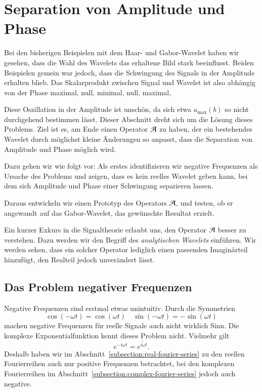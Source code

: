 \section{Separation von Amplitude und Phase}
\label{complex:separate}

Bei den bisherigen Beispielen mit dem Haar- und Gabor-Wavelet haben wir gesehen, dass die Wahl des Wavelets das erhaltene Bild stark beeinflusst.
Beiden Beispielen gemein war jedoch, dass die Schwingung des Signals in der Amplitude erhalten blieb.
Das Skalarprodukt zwischen Signal und Wavelet ist also abhängig von der Phase maximal, null, minimal, null, maximal, \textellipsis

Diese Oszillation in der Amplitude ist unschön, da sich etwa $a_\text{max}(b)$ so nicht durchgehend bestimmen lässt.
Dieser Abschnitt dreht sich um die Lösung dieses Problems.
Ziel ist es, am Ende einen Operator $\Ana\,$ zu haben, der ein bestehendes Wavelet durch möglichst kleine Änderungen so anpasst, dass die Separation von Amplitude und Phase möglich wird.

Dazu gehen wir wie folgt vor:
Als erstes identifizieren wir negative Frequenzen als Ursache des Problems und zeigen, dass es kein reelles Wavelet geben kann, bei dem sich Amplitude und Phase einer Schwingung separieren lassen.

Daraus entwickeln wir einen Prototyp des Operators $\Ana\,$, und testen, ob er angewandt auf das Gabor-Wavelet, das gewünschte Resultat erzielt.

Ein kurzer Exkurs in die Signaltheorie erlaubt uns, den Operator $\Ana\,$ besser zu verstehen. 
Dazu werden wir den Begriff des \emph{analytischen Wavelets} einführen.
Wir werden sehen, dass ein solcher Operator lediglich einen passenden Imaginärteil hinzufügt, den Realteil jedoch unverändert lässt.

\subsection{Das Problem negativer Frequenzen}
Negative Frequenzen sind erstmal etwas unintuitiv.
Durch die Symmetrien
\[
	\cos(-\omega t) = \cos(\omega t)
	\quad
	\sin(-\omega t) = -\sin(\omega t)
\]
machen negative Frequenzen für reelle Signale auch nicht wirklich Sinn.
Die komplexe Exponential\-funktion kennt dieses Problem nicht.
Vielmehr gilt
\begin{equation}
	e^{-i\omega t} = \overline{e^{i\omega t}}.\label{complex:exp-inv-conj}
\end{equation}
Deshalb haben wir im Abschnitt~\ref{subsection:real-fourier-series} zu den reellen Fourierreihen auch nur positive Frequenzen betrachtet,
bei den komplexen Fourierreihen im Abschnitt~\ref{subsection:complex-fourier-series} jedoch auch negative.

